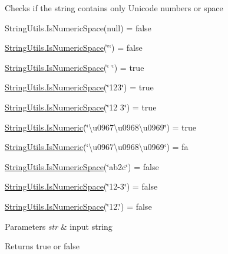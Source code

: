 Checks if the string contains only Unicode numbers or space 

String\+Utils.\+Is\+Numeric\+Space(null) = false 

\hyperlink{class_ultimate_1_1_utilities_1_1_string_utils_a1497cb8c5af666caea9f752738a7f25e}{String\+Utils.\+Is\+Numeric\+Space}(\char`\"{}\char`\"{}) = false 

\hyperlink{class_ultimate_1_1_utilities_1_1_string_utils_a1497cb8c5af666caea9f752738a7f25e}{String\+Utils.\+Is\+Numeric\+Space}(\char`\"{}  \char`\"{}) = true 

\hyperlink{class_ultimate_1_1_utilities_1_1_string_utils_a1497cb8c5af666caea9f752738a7f25e}{String\+Utils.\+Is\+Numeric\+Space}(\char`\"{}123\char`\"{}) = true 

\hyperlink{class_ultimate_1_1_utilities_1_1_string_utils_a1497cb8c5af666caea9f752738a7f25e}{String\+Utils.\+Is\+Numeric\+Space}(\char`\"{}12 3\char`\"{}) = true 

\hyperlink{class_ultimate_1_1_utilities_1_1_string_utils_a55f3fbe745289f5b8c9884d0052b39dd}{String\+Utils.\+Is\+Numeric}(\char`\"{}\textbackslash{}u0967\textbackslash{}u0968\textbackslash{}u0969\char`\"{}) = true 

\hyperlink{class_ultimate_1_1_utilities_1_1_string_utils_a55f3fbe745289f5b8c9884d0052b39dd}{String\+Utils.\+Is\+Numeric}(\char`\"{}\textbackslash{}u0967\textbackslash{}u0968\textbackslash{}u0969\char`\"{}) = fa 

\hyperlink{class_ultimate_1_1_utilities_1_1_string_utils_a1497cb8c5af666caea9f752738a7f25e}{String\+Utils.\+Is\+Numeric\+Space}(\char`\"{}ab2c\char`\"{}) = false 

\hyperlink{class_ultimate_1_1_utilities_1_1_string_utils_a1497cb8c5af666caea9f752738a7f25e}{String\+Utils.\+Is\+Numeric\+Space}(\char`\"{}12-\/3\char`\"{}) = false 

\hyperlink{class_ultimate_1_1_utilities_1_1_string_utils_a1497cb8c5af666caea9f752738a7f25e}{String\+Utils.\+Is\+Numeric\+Space}(\char`\"{}12.\char`\"{}) = false 


\begin{DoxyParams}{Parameters}
{\em str} & input string\\
\hline
\end{DoxyParams}
\begin{DoxyReturn}{Returns}
true or false
\end{DoxyReturn}
